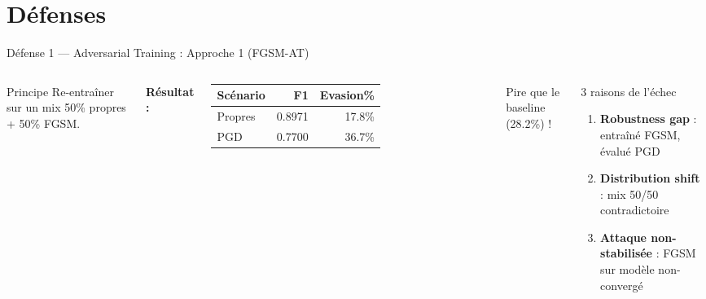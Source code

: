 \documentclass[aspectratio=169,11pt]{beamer}
\begin{document}
\section{D\'efenses}

\begin{frame}{D\'efense 1 --- Adversarial Training : Approche 1 (FGSM-AT)}
\begin{columns}[T]
\begin{block}{Principe}
Re-entra\^iner sur un mix 50\% propres + 50\% FGSM.
\end{block}
\vspace{0.3em}
\textbf{R\'esultat :}
\begin{table}
\scriptsize
\begin{tabular}{lrr}
\toprule
Sc\'enario & F1 & Evasion\% \\
\midrule
Propres & 0.8971 & 17.8\% \\
\rowcolor{myred!20}
PGD & 0.7700 & \alert{36.7\%} \\
\bottomrule
\end{tabular}
\end{table}

\alert{Pire que le baseline (28.2\%) !}

\begin{alertblock}{3 raisons de l'\'echec}
\begin{enumerate}
\scriptsize
    \item \textbf{Robustness gap} : entra\^in\'e FGSM, \'evalu\'e PGD
    \item \textbf{Distribution shift} : mix 50/50 contradictoire
    \item \textbf{Attaque non-stabilis\'ee} : FGSM sur mod\`ele non-converg\'e
\end{enumerate}
\end{alertblock}
\end{columns}
\end{frame}
\end{document}

